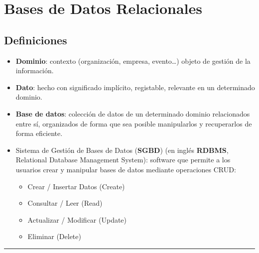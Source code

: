 \documentclass[]{book}
\providecommand{\tightlist}{%
  \setlength{\itemsep}{0pt}\setlength{\parskip}{0pt}}
\begin{document}
\section{Bases de Datos Relacionales}\label{bases-de-datos-relacionales}

\subsection{Definiciones}\label{definiciones}

\begin{itemize}
\item
  \textbf{Dominio}: contexto (organización, empresa, evento\ldots{})
  objeto de gestión de la información.
\item
  \textbf{Dato}: hecho con significado implícito, registable, relevante
  en un determinado dominio.
\item
  \textbf{Base de datos}: colección de datos de un determinado dominio
  relacionados entre sí, organizados de forma que sea posible
  manipularlos y recuperarlos de forma eficiente.
\item
  Sistema de Gestión de Bases de Datos (\textbf{SGBD}) (en inglés
  \textbf{RDBMS}, Relational Database Management System): software que
  permite a los usuarios crear y manipular bases de datos mediante
  operaciones CRUD:

  \begin{itemize}
  \tightlist
  \item
    Crear / Insertar Datos (Create)
  \item
    Consultar / Leer (Read)
  \item
    Actualizar / Modificar (Update)
  \item
    Eliminar (Delete)
  \end{itemize}
\end{itemize}

\begin{center}\rule{0.5\linewidth}{\linethickness}\end{center}
\end{document}

